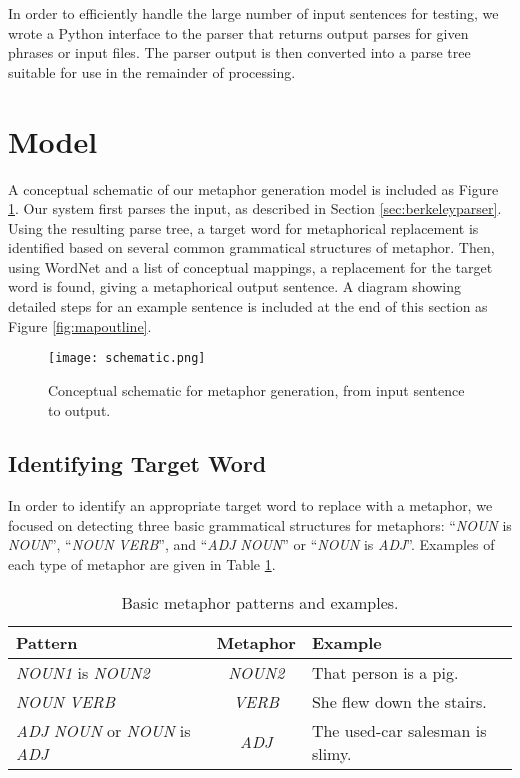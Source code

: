 \documentclass[12pt]{article}
\begin{document}
In order to efficiently handle the large number of input sentences for testing, we wrote a Python interface to the parser that returns output parses for given phrases or input files.  The parser output is then converted into a parse tree suitable for use in the remainder of processing.

\section{Model}

A conceptual schematic of our metaphor generation model is included as Figure \ref{fig:schematic}.  Our system first parses the input, as described in Section \ref{sec:berkeleyparser}.  Using the resulting parse tree, a target word for metaphorical replacement is identified based on several common grammatical structures of metaphor.  Then, using WordNet and a list of conceptual mappings, a replacement for the target word is found, giving a metaphorical output sentence.  A diagram showing detailed steps for an example sentence is included at the end of this section as Figure \ref{fig:mapoutline}.

\begin{figure}[h]
	\centering
	\texttt{[image: schematic.png]}
	\caption{Conceptual schematic for metaphor generation, from input sentence to output.}
	\label{fig:schematic}
\end{figure}

\subsection{Identifying Target Word}
\label{sec:identtarget}
In order to identify an appropriate target word to replace with a metaphor, we focused on detecting three basic grammatical structures for metaphors: ``\emph{NOUN} is \emph{NOUN}'', ``\emph{NOUN} \emph{VERB}'', and ``\emph{ADJ} \emph{NOUN}'' or ``\emph{NOUN} is \emph{ADJ}''.  Examples of each type of metaphor are given in Table \ref{tab:metaphorexamples}.

\begin{table}[h]
	\centering
	\small
	\begin{tabular}{|l|c|l|} \hline
		\textbf{Pattern} & \textbf{Metaphor} & \textbf{Example}\\	\hline
		\emph{NOUN1} is \emph{NOUN2} & \emph{NOUN2} & That person is a pig.\\ \hline
		\emph{NOUN} \emph{VERB} & \emph{VERB} & She flew down the stairs.\\ \hline
		\emph{ADJ} \emph{NOUN} or \emph{NOUN} is \emph{ADJ} & \emph{ADJ} & The used-car salesman is slimy.\\ \hline
	\end{tabular}
	\caption{Basic metaphor patterns and examples.}
	\label{tab:metaphorexamples}
\end{table}
\end{document}
